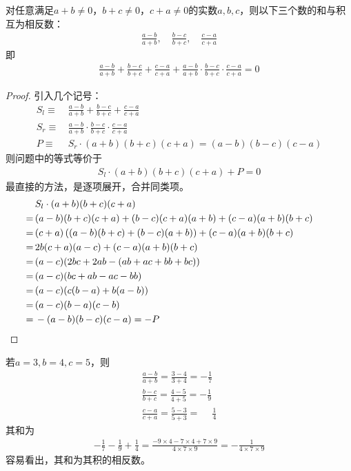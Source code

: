 \begin{example}\label{ex:sum-is-negative-to-product}
  对任意满足$a+b\ne0$，$b+c\ne0$，$c+a\ne0$的实数$a,b,c$，则以下三个数的和与积互为相反数：
  \begin{align*}
    \frac{a-b}{a+b},\quad \frac{b-c}{b+c},\quad \frac{c-a}{c+a}
  \end{align*}
  即
  \begin{align*}
    \frac{a-b}{a+b} + \frac{b-c}{b+c} + \frac{c-a}{c+a} 
    + \frac{a-b}{a+b} \cdot \frac{b-c}{b+c} \cdot \frac{c-a}{c+a} = 0
  \end{align*}
\end{example}
\begin{proof}
  引入几个记号：
  \begin{align*}
    S_{l}\equiv&\, \frac{a-b}{a+b} + \frac{b-c}{b+c} + \frac{c-a}{c+a} \\
    S_{r}\equiv&\,\frac{a-b}{a+b} \cdot \frac{b-c}{b+c} \cdot \frac{c-a}{c+a}\\
    P\equiv&\,S_{r}\cdot (a+b)(b+c)(c+a) = (a-b)(b-c)(c-a)
  \end{align*}
  则问题中的等式等价于
  \begin{align*}
    S_{l}\cdot (a+b)(b+c)(c+a) + P = 0
  \end{align*}
  最直接的方法，是逐项展开，合并同类项。
  \begin{align*}
     &\, S_{l}\cdot (a+b)(b+c)(c+a)\\
    =&\, (a-b)(b+c)(c+a) + (b-c)(c+a)(a+b) + (c-a)(a+b)(b+c)\\
    =&\, (c+a)\left( (a-b)(b+c) + (b-c)(a+b) \right) + (c-a)(a+b)(b+c)\\
    =&\, 2b(c+a)(a-c) + (c-a)(a+b)(b+c)\\
    =&\, (a-c)(2bc+2ab - (ab+ac+bb+bc))\\
    =&\, (a-c)(bc+ab - ac-bb)\\
    =&\, (a-c)(c(b-a)+b(a-b))\\
    =&\, (a-c)(b-a)(c-b)\\
    =&\, -(a-b)(b-c)(c-a) = -P&&\qedhere
  \end{align*}
\end{proof}

\begin{example}
  若$a=3,b=4,c=5$，则
  \begin{align*}
    \frac{a-b}{a+b} = \frac{3-4}{3+4} = -\frac17\\
    \frac{b-c}{b+c} = \frac{4-5}{4+5} = -\frac19\\
    \frac{c-a}{c+a} = \frac{5-3}{5+3} = \phantom{-}\frac14
  \end{align*}
  其和为
  \begin{align*}
    -\frac17 - \frac19 + \frac14 = \frac{-9\times4 - 7\times4 + 7\times9}{4\times7\times9} = -\frac1{4\times7\times9}
  \end{align*}
  容易看出，其和为其积的相反数。
\end{example}

